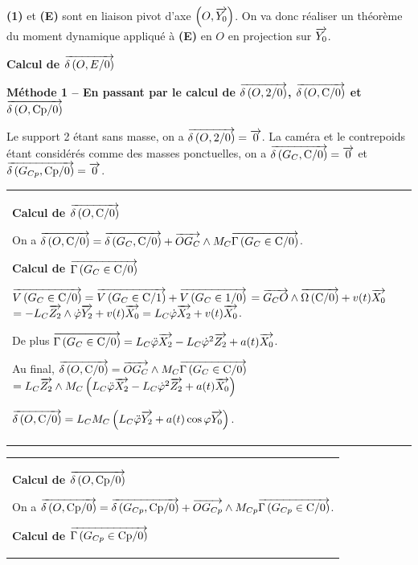 \documentclass[10pt,fleqn]{article} %
\begin{document}
\begin{multicols}{2}
\ifprof
\begin{corrige}
\textbf{(1)} et \textbf{(E)} sont en liaison pivot d'axe $\axe{O}{Y_0}$. On va donc réaliser un théorème du moment dynamique appliqué à \textbf{(E)} en $O$ en projection sur $\vect{Y_0}$. 

\textbf{Calcul de $\vectmd{O}{E}{0}$}

\textbf{Méthode 1 -- En passant par le calcul de $\vectmd{O}{\text{2}}{0}$, $\vectmd{O}{\text{C}}{0}$ et $\vectmd{O}{\text{Cp}}{0}$}


Le support 2 étant sans masse, on a $\vectmd{O}{\text{2}}{0}=\vect{0}$. La caméra et le contrepoids étant considérés comme des masses ponctuelles, on a $\vectmd{G_C}{\text{C}}{0}=\vect{0}$ et $\vectmd{G_{Cp}}{\text{Cp}}{0}=\vect{0}$.

 \begin{tabular}{|p{.9\linewidth}}
\textbf{Calcul de $\vectmd{O}{\text{C}}{0}$}

 On a $\vectmd{O}{\text{C}}{0} = \vectmd{G_{C}}{\text{C}}{0}+\vect{OG_C} \wedge M_C\vectg{G_{C}}{\text{C}}{0}$.
 
\textbf{Calcul de $\vectg{G_{C}}{\text{C}}{0}$}

$\vectv{G_C}{\text{C}}{0}=\vectv{G_C}{\text{C}}{1}+\vectv{G_C}{\text{1}}{0}$ $=\vect{G_CO}\wedge \vecto{\text{C}}{0}+v(t)\vect{X_0}$ $=-L_C\vect{Z_2}\wedge \dot{\varphi}\vect{Y_2}+v(t)\vect{X_0}=L_C \dot{\varphi}\vect{X_2}+v(t)\vect{X_0}$.

De plus  $\vectg{G_C}{\text{C}}{0}=L_C \ddot{\varphi}\vect{X_2}-L_C \dot{\varphi}^2\vect{Z_2}+a(t)\vect{X_0}$.

Au final, $\vectmd{O}{\text{C}}{0} = \vect{OG_C} \wedge M_C\vectg{G_{C}}{\text{C}}{0}$
$ =L_C\vect{Z_2} \wedge M_C \left( L_C \ddot{\varphi}\vect{X_2}-L_C \dot{\varphi}^2\vect{Z_2}+a(t)\vect{X_0} \right)$

$\vectmd{O}{\text{C}}{0} =L_C M_C \left( L_C \ddot{\varphi}\vect{Y_2} +a(t) \cos \varphi \vect{Y_0} \right)$.

\end{tabular}

\vspace{.25cm}

 \begin{tabular}{|p{.9\linewidth}}
\textbf{Calcul de $\vectmd{O}{\text{Cp}}{0}$}

 On a $\vectmd{O}{\text{Cp}}{0} = \vectmd{G_{Cp}}{\text{Cp}}{0}+\vect{OG_{Cp}} \wedge M_{Cp}\vectg{G_{Cp}}{\text{C}}{0}$.

\textbf{Calcul de $\vectg{G_{Cp}}{\text{Cp}}{0}$}


\end{tabular}
\end{corrige}
\end{multicols}
\end{document}
